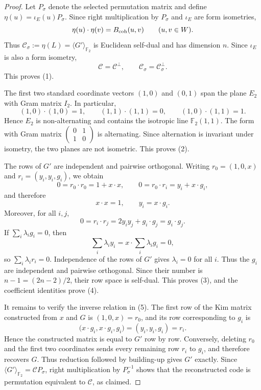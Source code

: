 \documentclass[12pt]{article}
\begin{document}
\begin{proof}
Let \(P_\sigma\) denote the selected permutation matrix and define
\(\eta(u)=\iota_E(u)P_\sigma\). Since right multiplication by
\(P_\sigma\) and \(\iota_E\) are form isometries,
\[
\eta(u)\cdot\eta(v)=B_{\rm coh}(u,v)
\qquad(u,v\in W).
\]
Thus \(\mathcal C_\sigma:=\eta(L)=\langle G'\rangle_{\mathbb F_2}\) is Euclidean
self-dual and has dimension \(n\). Since \(\iota_E\) is also a form
isometry,
\[
\mathcal C=\mathcal C^\perp,
\qquad
\mathcal C_\sigma=\mathcal C_\sigma^\perp.
\]
This proves (1).

The first two standard coordinate vectors \((1,0)\) and \((0,1)\) span the
plane \(E_2\) with Gram matrix \(I_2\). In particular,
\[
(1,0)\cdot(1,0)=1,\qquad
(1,1)\cdot(1,1)=0,\qquad
(1,0)\cdot(1,1)=1.
\]
Hence \(E_2\) is non-alternating and contains the isotropic line
\(\mathbb F_2(1,1)\). The form with Gram matrix
\(\left(\begin{smallmatrix}0&1\\1&0\end{smallmatrix}\right)\) is
alternating. Since alternation is invariant under isometry, the two planes
are not isometric. This proves (2).

The rows of \(G'\) are independent and pairwise orthogonal. Writing
\(r_0=(1,0,x)\) and \(r_i=(y_i,y_i,g_i)\), we obtain
\[
0=r_0\cdot r_0=1+x\cdot x,
\qquad
0=r_0\cdot r_i=y_i+x\cdot g_i,
\]
and therefore
\[
x\cdot x=1,
\qquad y_i=x\cdot g_i.
\]
Moreover, for all \(i,j\),
\[
0=r_i\cdot r_j=2y_iy_j+g_i\cdot g_j=g_i\cdot g_j.
\]
If \(\sum_i\lambda_i g_i=0\), then
\[
\sum_i\lambda_i y_i
=x\cdot\sum_i\lambda_i g_i=0,
\]
so \(\sum_i\lambda_i r_i=0\). Independence of the rows of \(G'\) gives
\(\lambda_i=0\) for all \(i\). Thus the \(g_i\) are independent and
pairwise orthogonal. Since their number is \(n-1=(2n-2)/2\), their row
space is self-dual. This proves (3), and the coefficient identities prove
(4).

It remains to verify the inverse relation in (5).  The first row of the
Kim matrix constructed from \(x\) and \(G\) is \((1,0,x)=r_0\), and its
row corresponding to \(g_i\) is
\[
 \bigl(x\mathbin{\cdot}g_i,x\mathbin{\cdot}g_i,g_i\bigr)
   =(y_i,y_i,g_i)=r_i.
\]
Hence the constructed matrix is equal to \(G'\) row by row.  Conversely,
deleting \(r_0\) and the first two coordinates sends every remaining row
\(r_i\) to \(g_i\), and therefore recovers \(G\).  Thus reduction followed
by building-up gives \(G'\) exactly.  Since
\(\langle G'\rangle_{\mathbb F_2}=\mathcal C P_\sigma\), right multiplication by
\(P_\sigma^{-1}\) shows that the reconstructed code is permutation
equivalent to \(\mathcal C\), as
claimed.
\end{proof}
\end{document}
